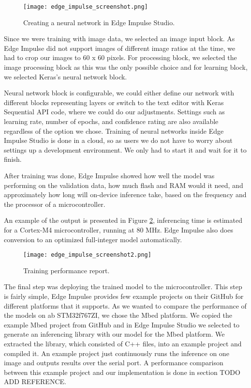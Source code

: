 \begin{figure}[ht]
    \centering
    \texttt{[image: edge\_impulse\_screenshot.png]} 
    \caption{Creating a neural network in Edge Impulse Studio.}
    \label{edge_impulse_screenshot}
\end{figure}

Since we were training with image data, we selected an image input block. As Edge Impulse did not support images of different image ratios at the time, we had to crop our images to 60 x 60 pixels.
For processing block, we selected the image processing block as this was the only possible choice and for learning block, we selected Keras's neural network block.

Neural network block is configurable, we could either define our network with different blocks representing layers or switch to the text editor with Keras Sequential API code, where we could do our adjustments.
Settings such as learning rate, number of epochs, and confidence rating are also available regardless of the option we chose.
Training of neural networks inside Edge Impulse Studio is done in a cloud, so as users we do not have to worry about settings up a development environment.
We only had to start it and wait for it to finish.

After training was done, Edge Impulse showed how well the model was performing on the validation data, how much flash and RAM would it need, and approximately how long will on-device inference take, based on the frequency and the processor of a microcontroller.

An example of the output is presented in Figure \ref{edge_impulse_screenshot2}, inferencing time is estimated for a Cortex-M4 microcontroller, running at 80 \si{\mega\hertz}.
Edge Impulse also does conversion to an optimized full-integer model automatically.

\begin{figure}[ht]
    \centering
    \texttt{[image: edge\_impulse\_screenshot2.png]} 
    \caption{ Training performance report.}
    \label{edge_impulse_screenshot2}
\end{figure}

The final step was deploying the trained model to the microcontroller.
This step is fairly simple, Edge Impulse provides few example projects on their GitHub for different platforms that it supports.
As we wanted to compare the performance of the models on ab STM32f767ZI, we chose the Mbed platform.
We copied the example Mbed project from GitHub and in Edge Impulse Studio we selected to generate an inferencing library with our model for the Mbed platform.
We extracted the library, which consisted of C++ files, into an example project and compiled it.
An example project just continuously runs the inference on one image and outputs results over the serial port.
A performance comparison between this example project and our implementation is done in section TODO ADD REFERENCE.
